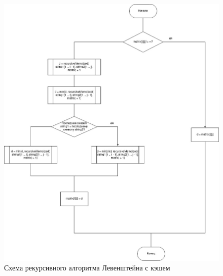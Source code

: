 \documentclass[12pt]{report}
\begin{document}
\begin{figure}[h]
	\centering
	\includegraphics[scale=0.4]{mem.jpg}
	\caption{Схема рекурсивного алгоритма Левенштейна с кэшем}
	\label{fig:mpr}
\end{figure}

\newpage
\end{document}
